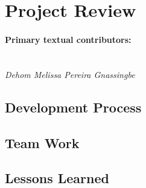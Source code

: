 \section{Project Review}
\label{sec:project review}

\paragraph{Primary textual contributors:}
\mbox{}\\\emph{Dehom Melissa Pereira Gnassingbe}

\subsection{Development Process}


\subsection{Team Work}


\subsection{Lessons Learned}





